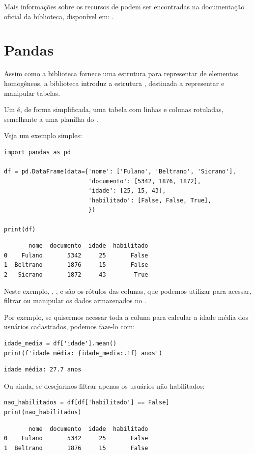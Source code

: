Mais informações sobre os recursos de  podem ser encontradas na documentação oficial da biblioteca,
disponível em: .



\section{Pandas}

Assim como a biblioteca  fornece uma estrutura para representar  de elementos homogêneos,
a biblioteca  introduz a estrutura , destinada a representar e manipular tabelas.

Um  é, de forma simplificada, uma tabela com linhas e colunas rotuladas, semelhante a uma
planilha do .

Veja um exemplo simples:
\begin{verbatim}
import pandas as pd

df = pd.DataFrame(data={'nome': ['Fulano', 'Beltrano', 'Sicrano'],
                        'documento': [5342, 1876, 1872],
                        'idade': [25, 15, 43],
                        'habilitado': [False, False, True],
                        })

print(df)
\end{verbatim}
\begin{verbatim}
       nome  documento  idade  habilitado
0    Fulano       5342     25       False
1  Beltrano       1876     15       False
2   Sicrano       1872     43        True
\end{verbatim}

Neste exemplo, , ,  e  são os rótulos das colunas,
que podemos utilizar para acessar, filtrar ou manipular os dados armazenados no .

Por exemplo, se quisermos acessar toda a coluna  para calcular a idade média dos usuários cadastrados,
podemos faze-lo com:
\begin{verbatim}
idade_media = df['idade'].mean()
print(f'idade média: {idade_media:.1f} anos')
\end{verbatim}
\begin{verbatim}
idade média: 27.7 anos
\end{verbatim}

Ou ainda, se desejarmos filtrar apenas os usuários não habilitados:
\begin{verbatim}
nao_habilitados = df[df['habilitado'] == False]
print(nao_habilitados)
\end{verbatim}
\begin{verbatim}
       nome  documento  idade  habilitado
0    Fulano       5342     25       False
1  Beltrano       1876     15       False
\end{verbatim}

